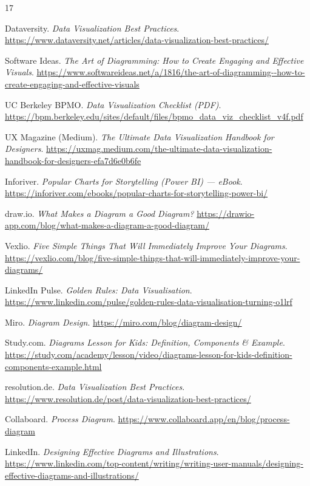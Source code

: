 \documentclass[11pt]{article}
\begin{document}
\newpage
\begin{thebibliography}{17}

Dataversity. \emph{Data Visualization Best Practices}.
\url{https://www.dataversity.net/articles/data-visualization-best-practices/}

Software Ideas. \emph{The Art of Diagramming: How to Create Engaging and Effective Visuals}.
\url{https://www.softwareideas.net/a/1816/the-art-of-diagramming--how-to-create-engaging-and-effective-visuals}

UC Berkeley BPMO. \emph{Data Visualization Checklist (PDF)}.
\url{https://bpm.berkeley.edu/sites/default/files/bpmo_data_viz_checklist_v4f.pdf}

UX Magazine (Medium). \emph{The Ultimate Data Visualization Handbook for Designers}.
\url{https://uxmag.medium.com/the-ultimate-data-visualization-handbook-for-designers-efa7d6e0b6fe}

Inforiver. \emph{Popular Charts for Storytelling (Power BI) --- eBook}.
\url{https://inforiver.com/ebooks/popular-charts-for-storytelling-power-bi/}

draw.io. \emph{What Makes a Diagram a Good Diagram?}
\url{https://drawio-app.com/blog/what-makes-a-diagram-a-good-diagram/}

Vexlio. \emph{Five Simple Things That Will Immediately Improve Your Diagrams}.
\url{https://vexlio.com/blog/five-simple-things-that-will-immediately-improve-your-diagrams/}

LinkedIn Pulse. \emph{Golden Rules: Data Visualisation}.
\url{https://www.linkedin.com/pulse/golden-rules-data-visualisation-turning-o1lrf}

Miro. \emph{Diagram Design}.
\url{https://miro.com/blog/diagram-design/}

Study.com. \emph{Diagrams Lesson for Kids: Definition, Components \& Example}.
\url{https://study.com/academy/lesson/video/diagrams-lesson-for-kids-definition-components-example.html}

resolution.de. \emph{Data Visualization Best Practices}.
\url{https://www.resolution.de/post/data-visualization-best-practices/}

Collaboard. \emph{Process Diagram}.
\url{https://www.collaboard.app/en/blog/process-diagram}

LinkedIn. \emph{Designing Effective Diagrams and Illustrations}.
\url{https://www.linkedin.com/top-content/writing/writing-user-manuals/designing-effective-diagrams-and-illustrations/}


\end{thebibliography}
\end{document}
